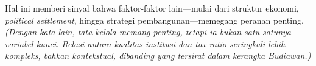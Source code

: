 Hal ini memberi sinyal bahwa faktor-faktor lain—mulai dari struktur ekonomi, \textit{political settlement}, hingga strategi pembangunan—memegang peranan penting.
\textit{(Dengan kata lain, tata kelola memang penting, tetapi ia bukan satu-satunya variabel kunci. Relasi antara kualitas institusi dan \textit{tax ratio} seringkali lebih kompleks, bahkan kontekstual, dibanding yang tersirat dalam kerangka Budiawan.)}
